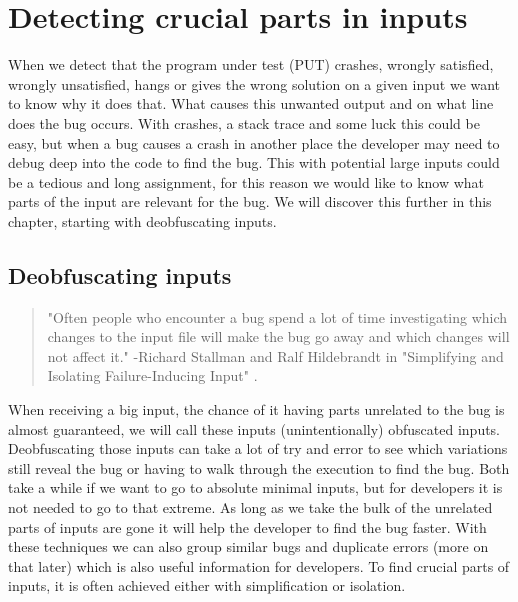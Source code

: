 \chapter{Detecting crucial parts in inputs}
\label{inputReduction:intro}
When we detect that the program under test (PUT) crashes, wrongly satisfied, wrongly unsatisfied, hangs or gives the wrong solution on a given input we want to know why it does that. What causes this unwanted output and on what line does the bug occurs. 
With crashes, a stack trace and some luck this could be easy, but when a bug causes a crash in another place the developer may need to debug deep into the code to find the bug. 
This with potential large inputs could be a tedious and long assignment, for this reason we would like to know what parts of the input are relevant for the bug. We will discover this further in this chapter, starting with deobfuscating inputs.


\section{Deobfuscating inputs}
\label{inputReduction:Deobfuscating}
\begin{quote}
	"Often people who encounter a bug spend a lot of time investigating which changes to the input file will make the bug go away and which changes will not affect it." 
	\newline
	-Richard Stallman and Ralf Hildebrandt in "Simplifying and Isolating Failure-Inducing Input" \cite{5zeller2002simplifyingIsolatingFailure-inducing}.
\end{quote} 
When receiving a big input, the chance of it having parts unrelated to the bug is almost guaranteed, we will call these inputs (unintentionally) obfuscated inputs. Deobfuscating those inputs can take a lot of try and error to see which variations still reveal the bug or having to walk through the execution to find the bug. Both take a while if we want to go to absolute minimal inputs, but for developers it is not needed to go to that extreme. As long as we take the bulk of the unrelated parts of inputs are gone it will help the developer to find the bug faster. With these techniques we can also group similar bugs and duplicate errors (more on that later) which is also useful information for developers. To find crucial parts of inputs, it is often achieved either with simplification or isolation. 

